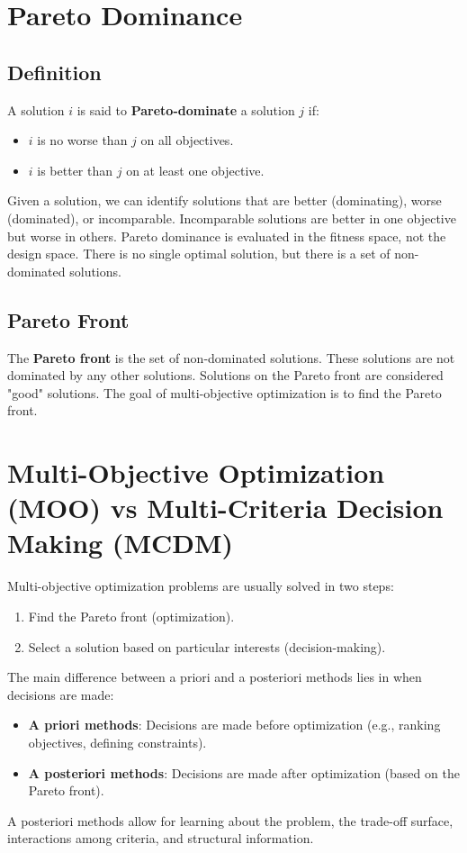 \section{Pareto Dominance}
\subsection*{Definition}

A solution $i$ is said to \textbf{Pareto-dominate} a solution $j$ if:

\begin{itemize}
    \item $i$ is no worse than $j$ on all objectives.
    \item $i$ is better than $j$ on at least one objective.
\end{itemize}
Given a solution, we can identify solutions that are better (dominating), worse (dominated), or incomparable.  Incomparable solutions are better in one objective but worse in others.  Pareto dominance is evaluated in the fitness space, not the design space.  There is no single optimal solution, but there is a set of non-dominated solutions.

\subsection*{Pareto Front}
The \textbf{Pareto front} is the set of non-dominated solutions. These solutions are not dominated by any other solutions.  Solutions on the Pareto front are considered "good" solutions. The goal of multi-objective optimization is to find the Pareto front.

\section{Multi-Objective Optimization (MOO) vs Multi-Criteria Decision Making (MCDM)}

Multi-objective optimization problems are usually solved in two steps:
\begin{enumerate}
    \item Find the Pareto front (optimization).
    \item Select a solution based on particular interests (decision-making).
\end{enumerate}
The main difference between a priori and a posteriori methods lies in when decisions are made:
\begin{itemize}
    \item \textbf{A priori methods}: Decisions are made before optimization (e.g., ranking objectives, defining constraints).
    \item \textbf{A posteriori methods}: Decisions are made after optimization (based on the Pareto front).
\end{itemize}
A posteriori methods allow for learning about the problem, the trade-off surface, interactions among criteria, and structural information.

